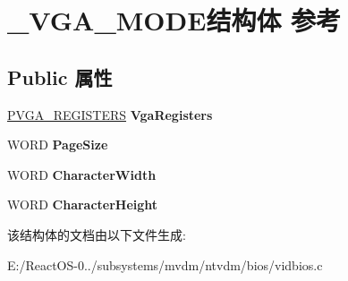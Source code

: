 \hypertarget{struct___v_g_a___m_o_d_e}{}\section{\+\_\+\+V\+G\+A\+\_\+\+M\+O\+D\+E结构体 参考}
\label{struct___v_g_a___m_o_d_e}
\subsection*{Public 属性}
\begin{DoxyCompactItemize}
\item 
\mbox{\label{struct___v_g_a___m_o_d_e_aa931b99fb62b52e81410c0eea745cce5}} 
\hyperlink{struct___v_g_a___r_e_g_i_s_t_e_r_s}{P\+V\+G\+A\+\_\+\+R\+E\+G\+I\+S\+T\+E\+RS} {\bfseries Vga\+Registers}
\item 
\mbox{\label{struct___v_g_a___m_o_d_e_a67a8ccb1575e3d4352bdc44cb600fba7}} 
W\+O\+RD {\bfseries Page\+Size}
\item 
\mbox{\label{struct___v_g_a___m_o_d_e_a8dc18120274669adc97922fb87055db0}} 
W\+O\+RD {\bfseries Character\+Width}
\item 
\mbox{\label{struct___v_g_a___m_o_d_e_ac7dbb4b06e73dfd90e0425b45a883196}} 
W\+O\+RD {\bfseries Character\+Height}
\end{DoxyCompactItemize}


该结构体的文档由以下文件生成\+:\begin{DoxyCompactItemize}
\item 
E\+:/\+React\+O\+S-\/0../subsystems/mvdm/ntvdm/bios/vidbios.\+c\end{DoxyCompactItemize}
